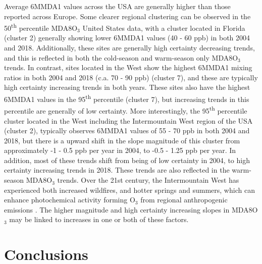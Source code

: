 \documentclass[journal abbreviation, manuscript]{copernicus}
\begin{document}
Average 6MMDA1 values across the USA are generally higher than those reported across Europe. Some clearer regional clustering can be observed in the 50\textsuperscript{th} percentile MDA8O$_3$ United States data, with a cluster located in Florida (cluster 2) generally showing lower 6MMDA1 values (40 - 60 ppb) in both 2004 and 2018. Additionally, these sites are generally high certainty decreasing trends, and this is reflected in both the cold-season and warm-season only MDA8O$_3$ trends. In contrast, sites located in the West show the highest 6MMDA1 mixing ratios in both 2004 and 2018 (c.a. 70 - 90 ppb) (cluster 7), and these are typically high certainty increasing trends in both years. These sites also have the highest 6MMDA1 values in the 95\textsuperscript{th} percentile (cluster 7), but increasing trends in this percentile are generally of low certainty. More interestingly, the 95\textsuperscript{th} percentile cluster located in the West including the Intermountain West region of the USA (cluster 2), typically observes 6MMDA1 values of 55 - 70 ppb in both 2004 and 2018, but there is a upward shift in the slope magnitude of this cluster from approximately -1 - 0.5 ppb per year in 2004, to -0.5 - 1.25 ppb per year. In addition, most of these trends shift from being of low certainty in 2004, to high certainty increasing trends in 2018. These trends are also reflected in the warm-season MDA8O$_3$ trends. Over the 21st century, the Intermountain West has experienced both increased wildfires, and hotter springs and summers, which can enhance photochemical activity forming O$_3$ from regional anthropogenic emissions \citep{Lin2017, Li2021, Peterson2021, Iglesias2022}. The higher magnitude and high certainty increasing slopes in MDA8O$_3$ may be linked to increases in one or both of these factors.

\section{Conclusions}  %
\end{document}
